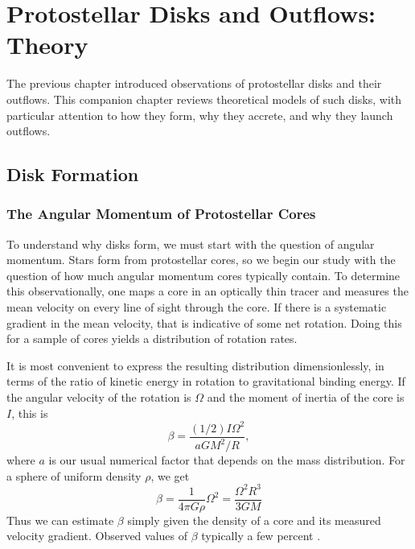 \chapter{Protostellar Disks and Outflows: Theory}
\label{ch:disks_theory}


The previous chapter introduced observations of protostellar disks and their outflows. This companion chapter reviews theoretical models of such disks, with particular attention to how they form, why they accrete, and why they launch outflows.

\section{Disk Formation}

\subsection{The Angular Momentum of Protostellar Cores}

To understand why disks form, we must start with the question of angular momentum. Stars form from protostellar cores, so we begin our study with the question of how much angular momentum cores typically contain. To determine this observationally, one maps a core in an optically thin tracer and measures the mean velocity on every line of sight through the core. If there is a systematic gradient in the mean velocity, that is indicative of some net rotation. Doing this for a sample of cores yields a distribution of rotation rates.

It is most convenient to express the resulting distribution dimensionlessly, in terms of the ratio of kinetic energy in rotation to gravitational binding energy. If the angular velocity of the rotation is $\Omega$ and the moment of inertia of the core is $I$, this is
\begin{equation}
\beta = \frac{(1/2)I\Omega^2}{a G M^2/R},
\end{equation}
where $a$ is our usual numerical factor that depends on the mass distribution. For a sphere of uniform density $\rho$, we get
\begin{equation}
\beta = \frac{1}{4\pi G \rho}\Omega^2 = \frac{\Omega^2 R^3}{3 G M}
\end{equation}
Thus we can estimate $\beta$ simply given the density of a core and its measured velocity gradient. Observed values of $\beta$ typically a few percent \citep[e.g.,][]{goodman93a}.

